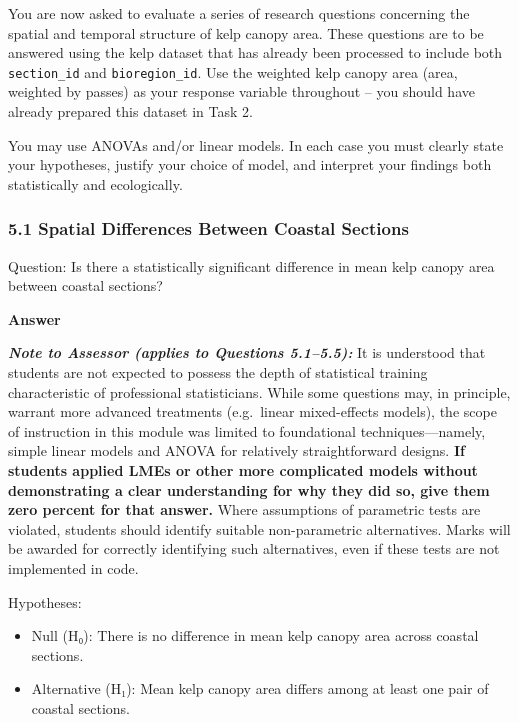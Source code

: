 \documentclass[
  british,
  10pt,
]{article}
\providecommand{\tightlist}{%
  \setlength{\itemsep}{0pt}\setlength{\parskip}{0pt}}
\let\oldtexttt\texttt
\renewcommand{\texttt}[1]{\oldtexttt{\small #1}}
\begin{document}
You are now asked to evaluate a series of research questions concerning
the spatial and temporal structure of kelp canopy area. These questions
are to be answered using the kelp dataset that has already been
processed to include both \texttt{section\_id} and
\texttt{bioregion\_id}. Use the weighted kelp canopy area (area,
weighted by passes) as your response variable throughout -- you should
have already prepared this dataset in Task 2.

You may use ANOVAs and/or linear models. In each case you must clearly
state your hypotheses, justify your choice of model, and interpret your
findings both statistically and ecologically.

\subsubsection{5.1 Spatial Differences Between Coastal
Sections}\label{spatial-differences-between-coastal-sections}

Question: Is there a statistically significant difference in mean kelp
canopy area between coastal sections?

\textbf{Answer}

\textbf{\emph{Note to Assessor (applies to Questions 5.1--5.5):}} It is
understood that students are not expected to possess the depth of
statistical training characteristic of professional statisticians. While
some questions may, in principle, warrant more advanced treatments
(e.g.~linear mixed-effects models), the scope of instruction in this
module was limited to foundational techniques---namely, simple linear
models and ANOVA for relatively straightforward designs. \textbf{If
students applied LMEs or other more complicated models without
demonstrating a clear understanding for why they did so, give them zero
percent for that answer.} Where assumptions of parametric tests are
violated, students should identify suitable non-parametric alternatives.
Marks will be awarded for correctly identifying such alternatives, even
if these tests are not implemented in code.

Hypotheses:

\begin{itemize}
\tightlist
\item
  Null (H₀): There is no difference in mean kelp canopy area across
  coastal sections.
\item
  Alternative (H₁): Mean kelp canopy area differs among at least one
  pair of coastal sections.
\end{itemize}
\end{document}
